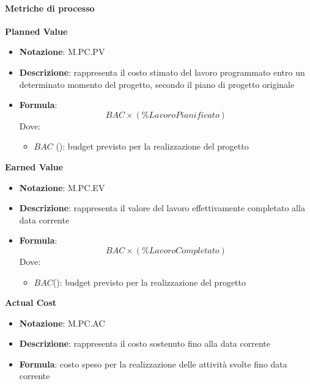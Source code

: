 \paragraph{Metriche di processo}
\textbf{Planned Value}
\begin{itemize}
    \item \textbf{Notazione}: M.PC.PV
    \item \textbf{Descrizione}: rappresenta il costo stimato del lavoro programmato entro un determinato momento del progetto, secondo il piano di progetto originale
    \item \textbf{Formula}: 
    \begin{equation}
        BAC \times (\% Lavoro Pianificato)
    \end{equation}
    Dove:
    \begin{itemize}
        \item $BAC$ (): budget previsto per la realizzazione del progetto
    \end{itemize}
    
\end{itemize}

\textbf{Earned Value}
\begin{itemize}
    \item \textbf{Notazione}: M.PC.EV
    \item \textbf{Descrizione}: rappresenta il valore del lavoro effettivamente completato alla data corrente
    \item \textbf{Formula}: 
    \begin{equation}
        BAC \times (\% Lavoro Completato)
    \end{equation}
    Dove:
    \begin{itemize}
        \item $BAC$(): budget previsto per la realizzazione del progetto
    \end{itemize}
        
    
\end{itemize}
\textbf{Actual Cost}
\begin{itemize}
    \item \textbf{Notazione}: M.PC.AC
    \item \textbf{Descrizione}: rappresenta il costo sostenuto fino alla data corrente
    \item \textbf{Formula}: costo speso per la realizzazione delle attività svolte fino data corrente
\end{itemize}

